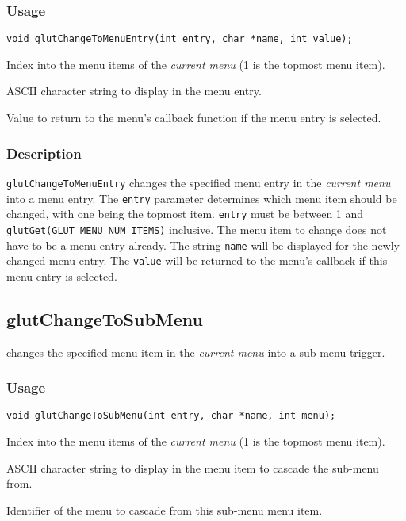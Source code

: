 \subsubsection*{Usage}
\begin{verbatim}
void glutChangeToMenuEntry(int entry, char *name, int value);
\end{verbatim}
\begin{description}
\itemsep 0in
\item[\tt entry]
Index into the menu items of the {\em current menu} (1 is the topmost
menu item).
\item[\tt name]
ASCII character string to display in the menu entry.
\item[\tt value]
Value to return to the menu's callback function if the menu entry is selected.
\end{description}

\subsubsection*{Description}

{\tt glutChangeToMenuEntry} changes the specified menu entry in the {\em current
menu} into a menu entry.  The {\tt entry} parameter determines which menu
item should be changed, with one being the topmost item.  
{\tt entry} must be between 1 and {\tt glutGet(GLUT\_MENU\_NUM\_ITEMS)}
inclusive.
The menu item to
change does not have to be a menu entry already.  The string {\tt name}
will be displayed for the newly changed menu entry.  The {\tt value}
will be returned to the menu's callback if this menu entry is selected.

\subsection{glutChangeToSubMenu}

 changes the specified menu item in the {\em
current menu} into a sub-menu trigger.

\subsubsection*{Usage}
\begin{verbatim}
void glutChangeToSubMenu(int entry, char *name, int menu);
\end{verbatim}
\begin{description}
\itemsep 0in
\item[\tt entry]
Index into the menu items of the {\em current menu} (1 is the topmost
menu item).
\item[\tt name]
ASCII character string to display in the menu item to cascade the sub-menu from.
\item[\tt menu]
Identifier of the menu to cascade from this sub-menu menu item.
\end{description}

